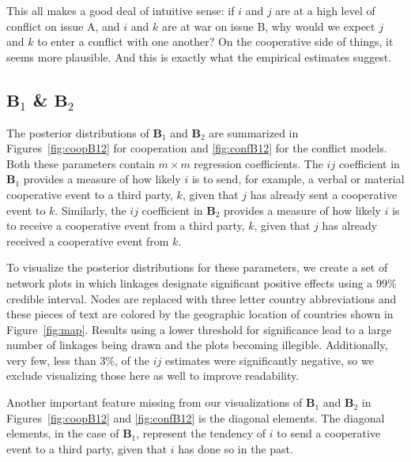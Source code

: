 \documentclass[3p,times,twocolumn,authoryear,12pt]{elsarticle}
\newcommand{\bl}[1]{{\mathbf #1}}
\begin{document}
This all makes a good deal of intuitive sense: if $i$ and $j$ are at a high level of conflict on issue A, and $i$ and $k$ are at war on issue B, why would we expect $j$ and $k$ to enter a conflict with one another? On the cooperative side of things, it seems more plausible. And this is exactly what the empirical estimates suggest.

\subsection{$\bl B_{1}$ \& $\bl B_{2}$} %


The posterior distributions of $\bl B_{1}$ and $\bl B_{2}$ are summarized in Figures~\ref{fig:coopB12} for cooperation and \ref{fig:confB12} for the conflict models. Both these parameters contain $m \times m$ regression coefficients. The $ij$ coefficient in $\bl B_{1}$ provides a measure of how likely $i$ is to send, for example, a verbal or material cooperative event to a third party, $k$, given that $j$ has already sent a cooperative event to $k$. Similarly, the $ij$ coefficient in $\bl B_{2}$ provides a measure of how likely $i$ is to receive a cooperative event from a third party, $k$, given that $j$ has already received a cooperative event from $k$. 

To visualize the posterior distributions for these parameters, we create a set of network plots in which linkages designate significant positive effects using a 99\% credible interval. Nodes are replaced with three letter country abbreviations and these pieces of text are colored by the geographic location of countries shown in Figure~\ref{fig:map}. Results using a lower threshold for significance lead to a large number of linkages being drawn and the plots becoming illegible. Additionally, very few, less than 3\%, of the $ij$ estimates were significantly negative, so we exclude visualizing those here as well to improve readability. 

Another important feature missing from our visualizations of $\bl B_{1}$ and $\bl B_{2}$ in Figures~\ref{fig:coopB12} and \ref{fig:confB12} is the diagonal elements. The diagonal elements, in the case of $\bl B_{1}$, represent the tendency of $i$ to send a cooperative event to a third party, given that $i$ has done so in the past. 
\end{document}
